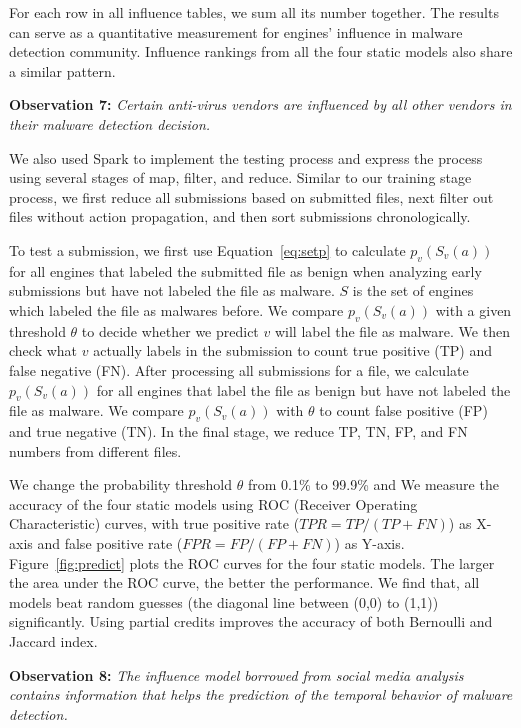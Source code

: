 For each row in all influence tables, we sum all its number together. 
The results can serve as a quantitative measurement for engines' influence in malware detection community. 
Influence rankings from all the four static models also share a similar pattern. 

{\bf Observation 7:} 
{\em Certain anti-virus vendors are influenced by all other vendors in their malware detection decision.}

We also used Spark to implement the testing process and express the process using several stages of map, filter, and reduce.
Similar to our training stage process, 
we first reduce all submissions based on submitted files,
next filter out files without action propagation, 
and then sort submissions chronologically. 

To test a submission, we first use Equation~\ref{eq:setp} to
calculate $p_v(S_v(a))$ for all engines
that labeled the submitted file as benign when analyzing early submissions 
but have not labeled the file as malware. 
$S$ is the set of engines which labeled the file as malwares before.
We compare $p_v(S_v(a))$ with a given threshold $\theta$ to decide whether we predict 
$v$ will label the file as malware.
We then check what $v$ actually labels in the submission to count true positive (TP) and false negative (FN). 
After processing all submissions for a file, 
we calculate $p_v(S_v(a))$ for all engines  
that label the file as benign but have not labeled the file as malware.
We compare $p_v(S_v(a))$ with $\theta$ to count false positive (FP) and true negative (TN).
In the final stage, we reduce TP, TN, FP, and FN numbers from different files.



We change the probability threshold $\theta$ from 0.1\% to 99.9\% 
and 
We measure the accuracy of the four static models using ROC (Receiver Operating Characteristic) curves,
with true positive rate ($TPR = TP/(TP+FN)$) as X-axis
and false positive rate ($FPR = FP/(FP + FN)$) as Y-axis. 
Figure~\ref{fig:predict} plots the ROC curves for the four static models.
The larger the area under the ROC curve, the better the performance.
We find that, all models beat random guesses
(the diagonal line between (0,0) to (1,1)) significantly. 
Using partial credits improves the accuracy of both Bernoulli and Jaccard index.

{\bf Observation 8:} 
{\em The influence model borrowed from
social media analysis contains information
that helps the prediction of the temporal
behavior of malware detection. }

